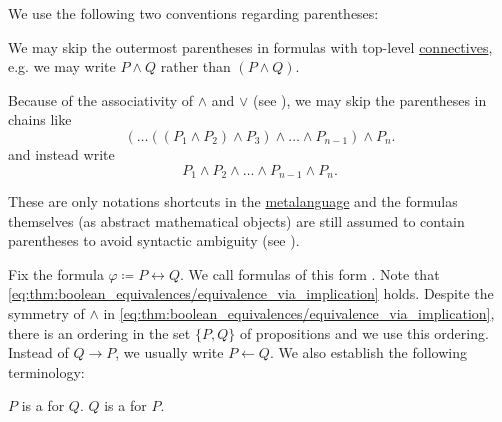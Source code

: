 \begin{remark}\label{remark:propositional_formula_parentheses}
  We use the following two conventions regarding parentheses:
  \begin{RemEnum}
     We may skip the outermost parentheses in formulas with top-level \hyperref[def:propositional_alphabet/connectives]{connectives}, e.g. we may write \( P \wedge Q \) rather than \( (P \wedge Q) \).

     Because of the associativity of \( \wedge \) and \( \vee \) (see ), we may skip the parentheses in chains like
    \begin{equation*}
      ( \ldots ((P_1 \wedge P_2) \wedge P_3) \wedge \ldots \wedge P_{n-1} ) \wedge P_n.
    \end{equation*}
    and instead write
    \begin{equation*}
      P_1 \wedge P_2 \wedge \ldots \wedge P_{n-1} \wedge P_n.
    \end{equation*}
  \end{RemEnum}

  These are only notations shortcuts in the \hyperref[remark:metalanguage_syntax_and_semantics]{metalanguage} and the formulas themselves (as abstract mathematical objects) are still assumed to contain parentheses to avoid syntactic ambiguity (see ).
\end{remark}

\begin{definition}\label{def:equivalence}
  Fix the formula \( \varphi \coloneqq P \leftrightarrow Q \). We call formulas of this form . Note that \eqref{eq:thm:boolean_equivalences/equivalence_via_implication} holds. Despite the symmetry of \( \wedge \) in \eqref{eq:thm:boolean_equivalences/equivalence_via_implication}, there is an ordering in the set \( \{ P, Q \} \) of propositions and we use this ordering. Instead of \( Q \rightarrow P \), we usually write \( P \leftarrow Q \). We also establish the following terminology:
  \begin{DefEnum}
     \( P \) is a  for \( Q \).
     \( Q \) is a  for \( P \).
  \end{DefEnum}
\end{definition}

